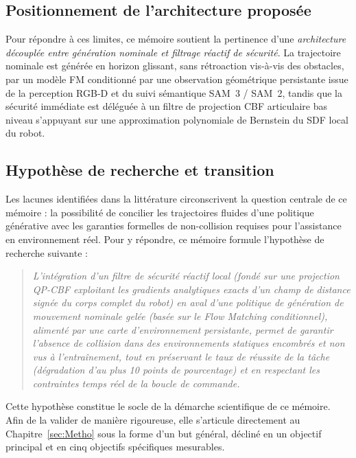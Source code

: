 \subsection{Positionnement de l'architecture proposée}
Pour répondre à ces limites, ce mémoire soutient la pertinence d'une \textit{architecture découplée entre génération nominale et filtrage réactif de sécurité}. La trajectoire nominale est générée en horizon glissant, sans rétroaction vis-à-vis des obstacles, par un modèle \ac{FM} conditionné par une observation géométrique persistante issue de la perception \ac{RGB-D} et du suivi sémantique \ac{SAM}~3 / \ac{SAM}~2, tandis que la sécurité immédiate est déléguée à un filtre de projection \ac{CBF} articulaire bas niveau s'appuyant sur une approximation polynomiale de Bernstein du \ac{SDF} local du robot.

\subsection{Hypothèse de recherche et transition}
Les lacunes identifiées dans la littérature circonscrivent la question centrale de ce mémoire : la possibilité de concilier les trajectoires fluides d'une politique générative avec les garanties formelles de non-collision requises pour l'assistance en environnement réel. Pour y répondre, ce mémoire formule l'hypothèse de recherche suivante :

\begin{quote}
\textit{L'intégration d'un filtre de sécurité réactif local (fondé sur une projection \ac{QP}-\ac{CBF} exploitant les gradients analytiques exacts d'un champ de distance signée du corps complet du robot) en aval d'une politique de génération de mouvement nominale gelée (basée sur le Flow Matching conditionnel), alimenté par une carte d'environnement persistante, permet de garantir l'absence de collision dans des environnements statiques encombrés et non vus à l'entraînement, tout en préservant le taux de réussite de la tâche (dégradation d'au plus 10 points de pourcentage) et en respectant les contraintes temps réel de la boucle de commande.}
\end{quote}

Cette hypothèse constitue le socle de la démarche scientifique de ce mémoire. Afin de la valider de manière rigoureuse, elle s'articule directement au Chapitre~\ref{sec:Metho} sous la forme d'un but général, décliné en un objectif principal et en cinq objectifs spécifiques mesurables.

